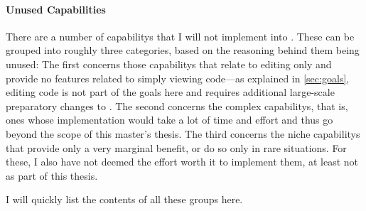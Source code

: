 \documentclass[../thesis]{subfiles}
\begin{document}
\paragraph{Unused Capabilities}
There are a number of \glspl{capability} that I will not implement into \SEE{}.
These can be grouped into roughly three categories, based on the reasoning behind them being unused:
The first concerns those \glspl{capability} that relate to editing only and provide no features related to simply viewing code---as explained in \cref{sec:goals}, editing code is not part of the goals here and requires additional large-scale preparatory changes to \SEE{}.
The second concerns the complex \glspl{capability}, that is, ones whose implementation would take a lot of time and effort and thus go beyond the scope of this master's thesis.
The third concerns the niche \glspl{capability} that provide only a very marginal benefit, or do so only in rare situations.
For these, I also have not deemed the effort worth it to implement them, at least not as part of this thesis.

I will quickly list the contents of all these groups here.
\end{document}
